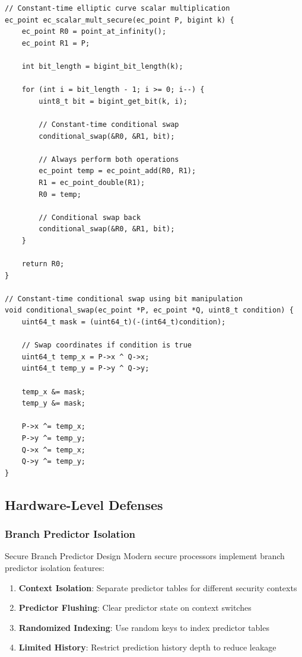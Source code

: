 \documentclass[11pt,a4paper]{article}
\theoremstyle{definition}
\begin{document}
\begin{lstlisting}[caption={Branch-Free Montgomery Ladder}]
// Constant-time elliptic curve scalar multiplication
ec_point ec_scalar_mult_secure(ec_point P, bigint k) {
    ec_point R0 = point_at_infinity();
    ec_point R1 = P;
    
    int bit_length = bigint_bit_length(k);
    
    for (int i = bit_length - 1; i >= 0; i--) {
        uint8_t bit = bigint_get_bit(k, i);
        
        // Constant-time conditional swap
        conditional_swap(&R0, &R1, bit);
        
        // Always perform both operations
        ec_point temp = ec_point_add(R0, R1);
        R1 = ec_point_double(R1);
        R0 = temp;
        
        // Conditional swap back
        conditional_swap(&R0, &R1, bit);
    }
    
    return R0;
}

// Constant-time conditional swap using bit manipulation
void conditional_swap(ec_point *P, ec_point *Q, uint8_t condition) {
    uint64_t mask = (uint64_t)(-(int64_t)condition);
    
    // Swap coordinates if condition is true
    uint64_t temp_x = P->x ^ Q->x;
    uint64_t temp_y = P->y ^ Q->y;
    
    temp_x &= mask;
    temp_y &= mask;
    
    P->x ^= temp_x;
    P->y ^= temp_y;
    Q->x ^= temp_x;
    Q->y ^= temp_y;
}
\end{lstlisting}

\subsection{Hardware-Level Defenses}

\subsubsection{Branch Predictor Isolation}

\begin{securitybox}{Secure Branch Predictor Design}
Modern secure processors implement branch predictor isolation features:

\begin{enumerate}
\item \textbf{Context Isolation}: Separate predictor tables for different security contexts
\item \textbf{Predictor Flushing}: Clear predictor state on context switches
\item \textbf{Randomized Indexing}: Use random keys to index predictor tables
\item \textbf{Limited History}: Restrict prediction history depth to reduce leakage
\end{enumerate}
\end{securitybox}
\end{document}
